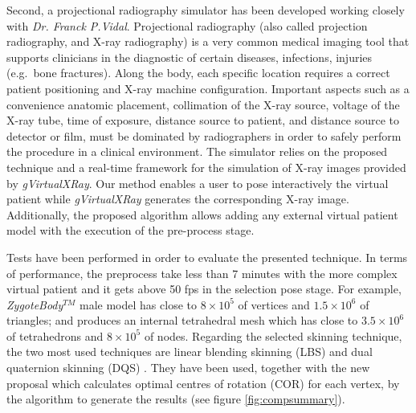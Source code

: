 Second, a projectional radiography simulator has been developed working closely with \emph{Dr. Franck P.Vidal}.   Projectional radiography (also called projection radiography, and X-ray radiography) is a very common medical imaging tool that supports clinicians in the diagnostic of certain diseases, infections, injuries (e.g.~bone fractures). Along the body, each specific location requires a correct patient positioning and X-ray machine configuration. Important aspects such as a convenience anatomic placement, collimation of the X-ray source, voltage of the X-ray tube, time of exposure, distance source to patient, and distance source to detector or film, must be dominated by radiographers in order to safely perform the procedure in a clinical environment. The simulator relies on the proposed technique and a real-time framework for the simulation of X-ray images provided by \emph{gVirtualXRay}\cite{sujar:hal}. Our method enables a user to pose interactively the virtual patient while \emph{gVirtualXRay} generates the corresponding X-ray image. Additionally, the proposed algorithm allows adding any external virtual patient model with the execution of the pre-process stage.  %



Tests have been performed in order to evaluate the presented technique. In terms of performance, the preprocess take less than 7 minutes with the more complex virtual patient and it gets above 50 fps in the selection pose stage. For example, \emph{ZygoteBody}$^{TM}$ male model has close to $8 \times 10^5$ of vertices and $1.5\times 10^6$ of triangles; and produces an internal tetrahedral mesh which has close to $3.5\times 10^6$ of tetrahedrons and $8 \times 10^5$ of nodes.  Regarding the selected skinning technique, the two most used techniques are linear blending skinning (LBS) \cite{thalmann88} and dual quaternion skinning (DQS) \cite{Kavan2008}. They have been used, together with the new proposal which calculates optimal centres of rotation (COR) \cite{le2016real} for each vertex, by the algorithm to generate the results (see figure \ref{fig:compsummary}). 

